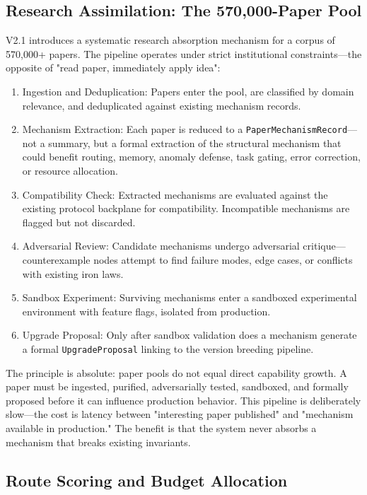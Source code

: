 \documentclass[12pt,a4paper]{article}
\begin{document}
\subsection{Research Assimilation: The 570,000-Paper Pool}


V2.1 introduces a systematic research absorption mechanism for a corpus of 570,000+ papers. The pipeline operates under strict institutional constraints---the opposite of "read paper, immediately apply idea":

\begin{enumerate}
  \item Ingestion and Deduplication: Papers enter the pool, are classified by domain relevance, and deduplicated against existing mechanism records.
  \item Mechanism Extraction: Each paper is reduced to a \texttt{PaperMechanismRecord}---not a summary, but a formal extraction of the structural mechanism that could benefit routing, memory, anomaly defense, task gating, error correction, or resource allocation.
  \item Compatibility Check: Extracted mechanisms are evaluated against the existing protocol backplane for compatibility. Incompatible mechanisms are flagged but not discarded.
  \item Adversarial Review: Candidate mechanisms undergo adversarial critique---counterexample nodes attempt to find failure modes, edge cases, or conflicts with existing iron laws.
  \item Sandbox Experiment: Surviving mechanisms enter a sandboxed experimental environment with feature flags, isolated from production.
  \item Upgrade Proposal: Only after sandbox validation does a mechanism generate a formal \texttt{UpgradeProposal} linking to the version breeding pipeline.
\end{enumerate}

The principle is absolute: paper pools do not equal direct capability growth. A paper must be ingested, purified, adversarially tested, sandboxed, and formally proposed before it can influence production behavior. This pipeline is deliberately slow---the cost is latency between "interesting paper published" and "mechanism available in production." The benefit is that the system never absorbs a mechanism that breaks existing invariants.

\subsection{Route Scoring and Budget Allocation}
\end{document}
